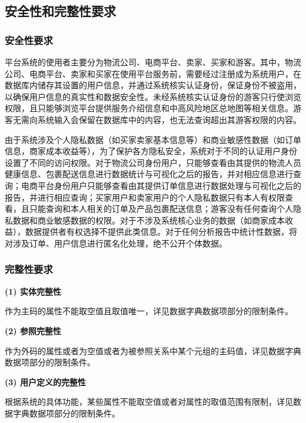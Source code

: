 \documentclass[12pt]{article}
\begin{document}
\subsection{安全性和完整性要求}

\subsubsection{安全性要求}

平台系统的使用者主要分为物流公司、电商平台、卖家、买家和游客。其中，物流公司、电商平台、卖家和买家在使用平台服务前，需要经过注册成为系统用户，在数据库内储存其设置的用户信息，并通过系统核实认证身份，保证身份不被盗用，以确保用户信息的真实性和数据安全性。未经系统核实认证身份的游客只行使浏览权限，且只能够浏览平台提供服务介绍信息和中高风险地区总地图等相关信息。游客无需向系统输入会保留在数据库中的内容，也无法查询超出其游客权限的内容。

由于系统涉及个人隐私数据（如买家卖家基本信息等）和商业敏感性数据（如订单信息，商家成本收益等），为了保护各方隐私安全，系统对于不同的认证用户身份设置了不同的访问权限。对于物流公司身份用户，只能够查看由其提供的物流人员健康信息、包裹配送信息进行数据统计与可视化之后的报告，并对相应信息进行查询；电商平台身份用户只能够查看由其提供订单信息进行数据处理与可视化之后的报告，并进行相应查询；买家用户和卖家用户的个人隐私数据只有本人有权限查看，且只能查询和本人相关的订单及产品包裹配送信息；游客没有任何查询个人隐私数据和商业敏感数据的权限。对于不涉及系统核心业务的数据（如商家成本收益），数据提供者有权选择不提供此类信息。对于任何分析报告中统计性数据，将对涉及订单、用户信息进行匿名化处理，绝不公开个体数据。

\subsubsection{完整性要求}

\noindent \textbf{(1) 实体完整性}
\par
\vspace{0.1cm}
\noindent 作为主码的属性不能取空值且取值唯一，详见数据字典数据项部分的限制条件。

\noindent \textbf{(2) 参照完整性}
\par
\vspace{0.1cm}
\noindent 作为外码的属性或者为空值或者为被参照关系中某个元组的主码值，详见数据字典数据项部分的限制条件。

\noindent \textbf{(3) 用户定义的完整性}
\par
\vspace{0.1cm}
\noindent 根据系统的具体功能，某些属性不能取空值或者对属性的取值范围有限制，详见数据字典数据项部分的限制条件。
\end{document}
